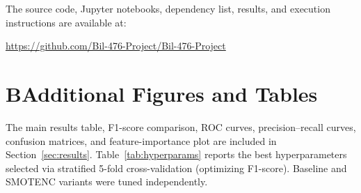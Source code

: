 \documentclass[conference]{IEEEtran}
\begin{document}
	The source code, Jupyter notebooks, dependency list, results, and execution instructions are available at:
	
	\url{https://github.com/Bil-476-Project/Bil-476-Project}
	
	\section*{B\quad Additional Figures and Tables}
	\label{app:additional}
	
	The main results table, F1-score comparison, ROC curves, precision--recall curves, confusion matrices, and feature-importance plot are included in Section~\ref{sec:results}. Table~\ref{tab:hyperparams} reports the best hyperparameters selected via stratified 5-fold cross-validation (optimizing F1-score). Baseline and SMOTENC variants were tuned independently.
	
	\begin{table}[htbp]
		\caption{Selected Hyperparameters (5-fold CV, optimizing F1)}
		\label{tab:hyperparams}
		\begin{center}
			\footnotesize
		\end{center}
	\end{table}
	
\end{document}
